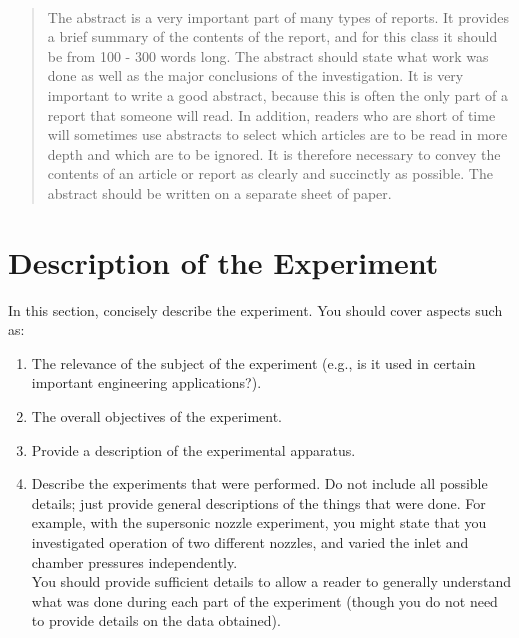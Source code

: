 \documentclass[12pt,letterpaper]{article}       %
\makeatletter
\let\thedate\@date
\makeatother
\begin{document}
\begin{titlepage}
	{\large \thedate}\\[2 cm]
 
	\vfill
	
\end{titlepage}

\begin{abstract}
	The abstract is a very important part of many types of reports. It provides a brief summary of the contents of the report, and for this class it should be from 100 - 300 words long. The abstract should state what work was done as well as the major conclusions of the investigation. It is very important to write a good abstract, because this is often the only part of a report that someone will read. In addition, readers who are short of time will sometimes use abstracts to select which articles are to be read in more depth and which are to be ignored. It is therefore necessary to convey the contents of an article or report as clearly and succinctly as possible.
	The abstract should be written on a separate sheet of paper.

	\clearpage
\end{abstract}


\section{Description of the Experiment}

In this section, concisely describe the experiment. You should cover aspects such as:
\begin{enumerate}
	\item The relevance of the subject of the experiment (e.g., is it used in certain important engineering applications?).

	\item The overall objectives of the experiment.

	\item Provide a description of the experimental apparatus.

	\item Describe the experiments that were performed. Do not include all possible details; just provide general descriptions of the things that were done. For example, with the supersonic nozzle experiment, you might state that you investigated operation of two different nozzles, and varied the inlet and chamber pressures independently.\\ 

	You should provide sufficient details to allow a reader to generally understand what was done during each part of the experiment (though you do not need to provide details on the data obtained).	
\end{enumerate}
\end{document}
